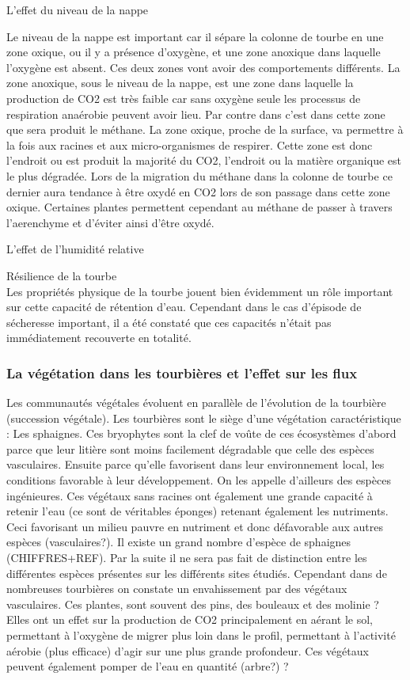 L'effet du niveau de la nappe \par
Le niveau de la nappe est important car il sépare la colonne de tourbe en une zone oxique, ou il y a présence d'oxygène, et une zone anoxique dans laquelle l'oxygène est absent.
Ces deux zones vont avoir des comportements différents.
La zone anoxique, sous le niveau de la nappe, est une zone dans laquelle la production de CO2 est très faible car sans oxygène seule les processus de respiration anaérobie peuvent avoir lieu.
Par contre dans c'est dans cette zone que sera produit le méthane.
La zone oxique, proche de la surface, va permettre à la fois aux racines et aux micro-organismes de respirer.
Cette zone est donc l'endroit ou est produit la majorité du CO2, l'endroit ou la matière organique est le plus dégradée.
Lors de la migration du méthane dans la colonne de tourbe ce dernier aura tendance à être oxydé en CO2 lors de son passage dans cette zone oxique.
Certaines plantes permettent cependant au méthane de passer à travers l'aerenchyme et d'éviter ainsi d'être oxydé.

L'effet de l'humidité relative \par

Résilience de la tourbe\\
Les propriétés physique de la tourbe jouent bien évidemment un rôle important sur cette capacité de rétention d'eau.
Cependant dans le cas d'épisode de sécheresse important, il a été constaté que ces capacités n'était pas immédiatement recouverte en totalité.


\subsubsection{La végétation dans les tourbières et l'effet sur les flux}
Les communautés végétales évoluent en parallèle de l'évolution de la tourbière (succession végétale).
Les tourbières sont le siège d'une végétation caractéristique : Les sphaignes.
Ces bryophytes sont la clef de voûte de ces écosystèmes d'abord parce que leur litière sont moins facilement dégradable que celle des espèces vasculaires.
Ensuite parce qu'elle favorisent dans leur environnement local, les conditions favorable à leur développement. 
On les appelle d'ailleurs des espèces ingénieures.
Ces végétaux sans racines ont également une grande capacité à retenir l'eau (ce sont de véritables éponges) retenant également les nutriments. 
Ceci favorisant un milieu pauvre en nutriment et donc défavorable aux autres espèces (vasculaires?).
Il existe un grand nombre d'espèce de sphaignes (CHIFFRES+REF).
Par la suite il ne sera pas fait de distinction entre les différentes espèces présentes sur les différents sites étudiés.
Cependant dans de nombreuses tourbières on constate un envahissement par des végétaux vasculaires.
Ces plantes, sont souvent des pins, des bouleaux et des molinie ?
Elles ont un effet sur la production de CO2 principalement en aérant le sol, permettant à l'oxygène de migrer plus loin dans le profil, permettant à l'activité aérobie (plus efficace) d'agir sur une plus grande profondeur.
Ces végétaux peuvent également pomper de l'eau en quantité (arbre?) ?


